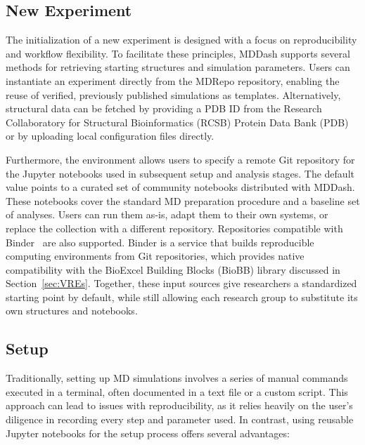 \documentclass[
  digital,     %
  color,       %
  oneside,     %
  nosansbold,  %
  nocolorbold, %
  lof,         %
  lot,         %
]{fithesis4}
\begin{document}
\subsection{New Experiment}
\label{sec:step_new_experiment}

The initialization of a new experiment is designed with a focus on reproducibility and workflow flexibility. To facilitate these principles, MDDash supports several methods for retrieving starting structures and simulation parameters. Users can instantiate an experiment directly from the MDRepo repository, enabling the reuse of verified, previously published simulations as templates. Alternatively, structural data can be fetched by providing a PDB ID from the Research Collaboratory for Structural Bioinformatics (RCSB) Protein Data Bank (PDB) or by uploading local configuration files directly.

Furthermore, the environment allows users to specify a remote Git repository for the Jupyter notebooks used in subsequent setup and analysis stages. The default value points to a curated set of community notebooks distributed with MDDash. These notebooks cover the standard MD preparation procedure and a baseline set of analyses. Users can run them as-is, adapt them to their own systems, or replace the collection with a different repository. Repositories compatible with Binder~\cite{binder} are also supported. Binder is a service that builds reproducible computing environments from Git repositories, which provides native compatibility with the BioExcel Building Blocks (BioBB) library discussed in Section~\ref{sec:VREs}. Together, these input sources give researchers a standardized starting point by default, while still allowing each research group to substitute its own structures and notebooks.

\subsection{Setup}
\label{sec:step_setup}

Traditionally, setting up MD simulations involves a series of manual commands executed in a terminal, often documented in a text file or a custom script. This approach can lead to issues with reproducibility, as it relies heavily on the user's diligence in recording every step and parameter used. In contrast, using reusable Jupyter notebooks for the setup process offers several advantages:
\end{document}
